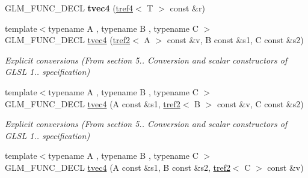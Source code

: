 \begin{DoxyCompactItemize}
\item 
\hypertarget{structglm_1_1detail_1_1tvec4_aac672cccaaf55ba163763d7bde03b956}{G\-L\-M\-\_\-\-F\-U\-N\-C\-\_\-\-D\-E\-C\-L {\bfseries tvec4} (\hyperlink{structglm_1_1detail_1_1tref4}{tref4}$<$ T $>$ const \&r)}\label{structglm_1_1detail_1_1tvec4_aac672cccaaf55ba163763d7bde03b956}

\item 
\hypertarget{structglm_1_1detail_1_1tvec4_a656ca512c584331127e1dc22f8b0b677}{{\footnotesize template$<$typename A , typename B , typename C $>$ }\\G\-L\-M\-\_\-\-F\-U\-N\-C\-\_\-\-D\-E\-C\-L \hyperlink{structglm_1_1detail_1_1tvec4_a656ca512c584331127e1dc22f8b0b677}{tvec4} (\hyperlink{structglm_1_1detail_1_1tref2}{tref2}$<$ A $>$ const \&v, B const \&s1, C const \&s2)}\label{structglm_1_1detail_1_1tvec4_a656ca512c584331127e1dc22f8b0b677}

\begin{DoxyCompactList}\small\item\em Explicit conversions (From section 5.. Conversion and scalar constructors of G\-L\-S\-L 1.. specification) \end{DoxyCompactList}\item 
\hypertarget{structglm_1_1detail_1_1tvec4_af98cd8a1b713ba61bc3b9f3c02732797}{{\footnotesize template$<$typename A , typename B , typename C $>$ }\\G\-L\-M\-\_\-\-F\-U\-N\-C\-\_\-\-D\-E\-C\-L \hyperlink{structglm_1_1detail_1_1tvec4_af98cd8a1b713ba61bc3b9f3c02732797}{tvec4} (A const \&s1, \hyperlink{structglm_1_1detail_1_1tref2}{tref2}$<$ B $>$ const \&v, C const \&s2)}\label{structglm_1_1detail_1_1tvec4_af98cd8a1b713ba61bc3b9f3c02732797}

\begin{DoxyCompactList}\small\item\em Explicit conversions (From section 5.. Conversion and scalar constructors of G\-L\-S\-L 1.. specification) \end{DoxyCompactList}\item 
\hypertarget{structglm_1_1detail_1_1tvec4_abc6cdc6d475e969efb4c0fbbfa045417}{{\footnotesize template$<$typename A , typename B , typename C $>$ }\\G\-L\-M\-\_\-\-F\-U\-N\-C\-\_\-\-D\-E\-C\-L \hyperlink{structglm_1_1detail_1_1tvec4_abc6cdc6d475e969efb4c0fbbfa045417}{tvec4} (A const \&s1, B const \&s2, \hyperlink{structglm_1_1detail_1_1tref2}{tref2}$<$ C $>$ const \&v)}\label{structglm_1_1detail_1_1tvec4_abc6cdc6d475e969efb4c0fbbfa045417}


\end{DoxyCompactItemize}
